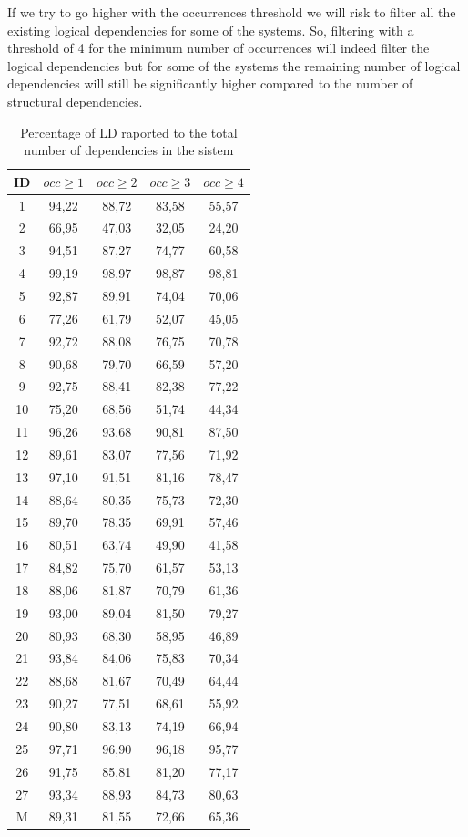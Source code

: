 \documentclass[conference]{IEEEtran}
\begin{document}
If we try to go higher with the occurrences threshold we will risk to filter all the existing logical dependencies for some of the systems.
So, filtering with a threshold of 4 for the minimum number of occurrences will indeed filter the logical dependencies but for some of the systems the remaining number of logical dependencies will still be significantly higher compared to the number of structural dependencies.



\begin{table}[!h]
\renewcommand{\arraystretch}{1.25}
\caption{Percentage of LD raported to the total number of dependencies in the sistem}
\label{table:ld_percentages}
\centering
\begin{tabular}{|c|c|c|c|c|}
\hline
    ID  & $occ\geq 1$ & $occ\geq 2$ & $occ\geq 3$ & $occ\geq 4$  \\
\hline
1	&	94,22	&	88,72	&	83,58	&	55,57	\\
2	&	66,95	&	47,03	&	32,05	&	24,20	\\
3	&	94,51	&	87,27	&	74,77	&	60,58	\\
4	&	99,19	&	98,97	&	98,87	&	98,81	\\
5	&	92,87	&	89,91	&	74,04	&	70,06	\\
6	&	77,26	&	61,79	&	52,07	&	45,05	\\
7	&	92,72	&	88,08	&	76,75	&	70,78	\\
8	&	90,68	&	79,70	&	66,59	&	57,20	\\
9	&	92,75	&	88,41	&	82,38	&	77,22	\\
10	&	75,20	&	68,56	&	51,74	&	44,34	\\
11	&	96,26	&	93,68	&	90,81	&	87,50	\\
12	&	89,61	&	83,07	&	77,56	&	71,92	\\
13	&	97,10	&	91,51	&	81,16	&	78,47	\\
14	&	88,64	&	80,35	&	75,73	&	72,30	\\
15	&	89,70	&	78,35	&	69,91	&	57,46	\\
16	&	80,51	&	63,74	&	49,90	&	41,58	\\
17	&	84,82	&	75,70	&	61,57	&	53,13	\\
18	&	88,06	&	81,87	&	70,79	&	61,36	\\
19	&	93,00	&	89,04	&	81,50	&	79,27	\\
20	&	80,93	&	68,30	&	58,95	&	46,89	\\
21	&	93,84	&	84,06	&	75,83	&	70,34	\\
22	&	88,68	&	81,67	&	70,49	&	64,44	\\
23	&	90,27	&	77,51	&	68,61	&	55,92	\\
24	&	90,80	&	83,13	&	74,19	&	66,94	\\
25	&	97,71	&	96,90	&	96,18	&	95,77	\\
26	&	91,75	&	85,81	&	81,20	&	77,17	\\
27	&	93,34	&	88,93	&	84,73	&	80,63	\\


\hline
M	&	89,31&	81,55&	72,66	&	65,36\\

\hline
\end{tabular}
\end{table}
\end{document}
